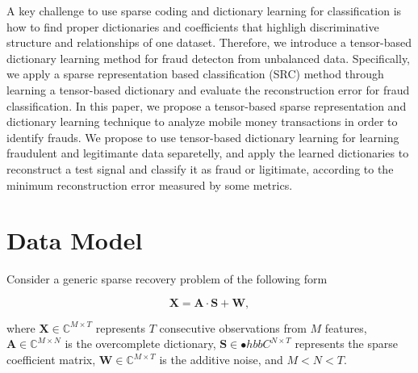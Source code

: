 \documentclass{article}
\begin{document}
A key challenge to use sparse coding and dictionary learning for classification is how to find proper dictionaries and coefficients that highligh discriminative structure and relationships of one dataset. Therefore, we introduce a tensor-based dictionary learning method for fraud detecton from unbalanced data. Specifically, we apply a sparse representation based classification (SRC) method through learning a tensor-based dictionary and evaluate the reconstruction error for fraud classification. In this paper, we propose a tensor-based sparse representation and dictionary learning technique to analyze mobile money transactions in order to identify frauds. We propose to use tensor-based dictionary learning for learning fraudulent and legitimante data separetelly, and apply the learned dictionaries to reconstruct a test signal and classify it as fraud or ligitimate, according to the minimum reconstruction error measured by some metrics.


\section{Data Model}

Consider a generic sparse recovery problem of the following form

\begin{equation}\label{eq:eq01}
\boldsymbol{X} = \boldsymbol{A} \cdot \boldsymbol{S} + \boldsymbol{W},
\end{equation}

where $\boldsymbol{X} \in \mathbb{C}^{M \times T}$ represents $T$ consecutive observations from $M$ features, $\boldsymbol{A} \in \mathbb{C}^{M \times N}$ is the overcomplete dictionary, $\boldsymbol{S} \in \mathbb{•}hbb{C}^{N \times T}$ represents the sparse coefficient matrix, $\boldsymbol{W} \in \mathbb{C}^{M \times T}$ is the additive noise, and $M < N < T$.
\end{document}
